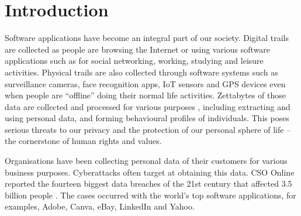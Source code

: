 \section{Introduction} \label{sec:intro}


Software applications have become an integral part of our society. Digital trails are collected as people are browsing the Internet or using various software applications such as for social networking, working, studying and leisure activities. Physical trails are also collected through software systems such as surveillance cameras, face recognition apps, IoT sensors and GPS devices even when people are ``offline'' doing their normal life activities. Zettabytes of those data are collected and processed for various purposes \cite{Statista2021a}, including extracting and using personal data, and forming behavioural profiles of individuals. This poses serious threats to our privacy and the protection of our personal sphere of life -- the cornerstone of human rights and values.

Organisations have been collecting personal data of their customers for various business purposes. Cyberattacks often target at obtaining this data. CSO Online reported the fourteen biggest data breaches of the 21st century that affected 3.5 billion people \cite{Swinhoe2020}. The cases occurred with the world's top software applications, for examples, Adobe, Canva, eBay, LinkedIn and Yahoo.

